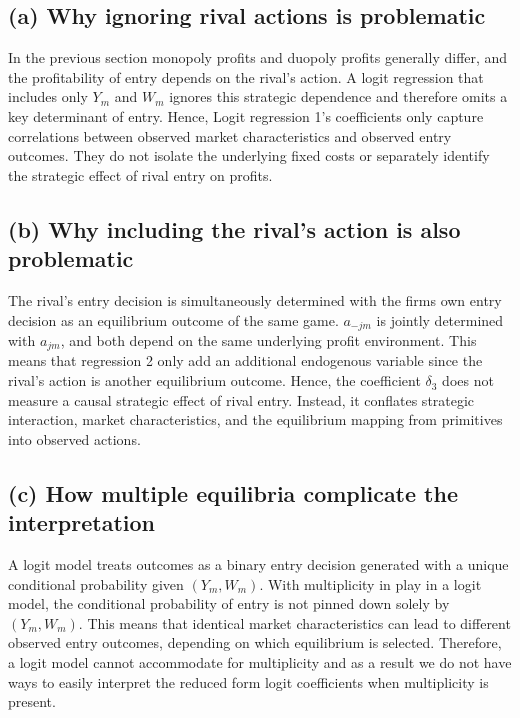 \documentclass[12pt]{article}
\begin{document}
\subsection*{(a) Why ignoring rival actions is problematic}

In the previous section monopoly profits and duopoly profits generally differ, and the profitability of entry depends on the rival's action. A logit regression that includes only \(Y_m\) and \(W_m\) ignores this strategic dependence and therefore omits a key determinant of entry. Hence, Logit regression 1's coefficients only capture correlations between observed market characteristics and observed entry outcomes. They do not isolate the underlying fixed costs or separately identify the strategic effect of rival entry on profits.

\subsection*{(b) Why including the rival's action is also problematic}

The rival's entry decision is simultaneously determined with the firms own entry decision as an equilibrium outcome of the same game. \(a_{-jm}\) is jointly determined with \(a_{jm}\), and both depend on the same underlying profit environment. This means that regression 2 only add an additional endogenous variable since the rival's action is another equilibrium outcome. Hence, the coefficient \(\delta_3\) does not measure a causal strategic effect of rival entry. Instead, it conflates strategic interaction, market characteristics, and the equilibrium mapping from primitives into observed actions.


\subsection*{(c) How multiple equilibria complicate the interpretation}

A logit model treats outcomes as a binary entry decision generated with a unique conditional probability given \((Y_m,W_m)\). With multiplicity in play in a logit model, the conditional probability of entry is not pinned down solely by \((Y_m,W_m)\). This means that identical market characteristics can lead to different observed entry outcomes, depending on which equilibrium is selected. Therefore, a logit model cannot accommodate for multiplicity and as a result we do not have ways to easily interpret the reduced form logit coefficients when multiplicity is present.
\end{document}
